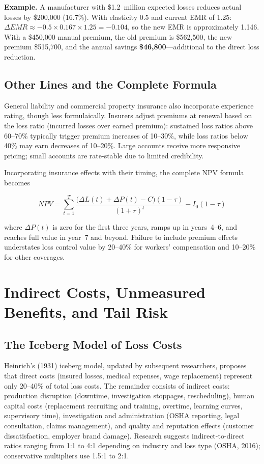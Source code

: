 \documentclass[11pt,openany]{book}
\begin{document}
\textbf{Example.} A manufacturer with \$1.2~million expected losses reduces
actual losses by \$200{,}000 (16.7\%). With elasticity 0.5 and current EMR of
1.25: \(\Delta EMR \approx -0.5 \times 0.167 \times 1.25 = -0.104\), so the
new EMR is approximately 1.146. With a \$450{,}000 manual premium, the old
premium is \$562{,}500, the new premium \$515{,}700, and the annual savings
\textbf{\$46{,}800}---additional to the direct loss reduction.

\subsection{Other Lines and the Complete Formula}

General liability and commercial property insurance also incorporate
experience rating, though less formulaically. Insurers adjust premiums at
renewal based on the loss ratio (incurred losses over earned premium):
sustained loss ratios above 60--70\% typically trigger premium increases of
10--30\%, while loss ratios below 40\% may earn decreases of 10--20\%. Large
accounts receive more responsive pricing; small accounts are rate-stable due
to limited credibility.

Incorporating insurance effects with their timing, the complete NPV formula
becomes

\[
NPV = \sum_{t=1}^{T}
\frac{\bigl(\Delta L(t) + \Delta P(t) - C\bigr)(1-\tau)}{(1+r)^t}
- I_0(1-\tau)
\]

where \(\Delta P(t)\) is zero for the first three years, ramps up in
years~4--6, and reaches full value in year~7 and beyond. Failure to include
premium effects understates loss control value by 20--40\% for workers'
compensation and 10--20\% for other coverages.

\section{Indirect Costs, Unmeasured Benefits, and Tail Risk}
\label{sec:appendix-indirect}

\subsection{The Iceberg Model of Loss Costs}

Heinrich's (1931) iceberg model, updated by subsequent researchers, proposes
that direct costs (insured losses, medical expenses, wage replacement)
represent only 20--40\% of total loss costs. The remainder consists of
indirect costs: production disruption (downtime, investigation stoppages,
rescheduling), human capital costs (replacement recruiting and training,
overtime, learning curves, supervisory time), investigation and administration
(OSHA reporting, legal consultation, claims management), and quality and
reputation effects (customer dissatisfaction, employer brand damage). Research
suggests indirect-to-direct ratios ranging from 1:1 to 4:1 depending on
industry and loss type (OSHA, 2016); conservative multipliers use 1.5:1 to
2:1.
\end{document}
